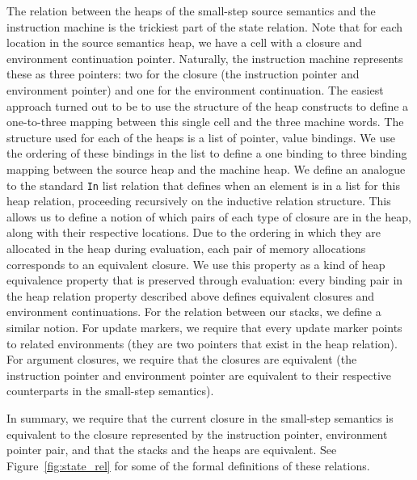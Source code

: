 The relation between the heaps of the small-step source semantics and the
instruction machine is the trickiest part of the state relation. Note that for
each location in the source semantics heap, we have a cell with a closure and
environment continuation pointer. Naturally, the instruction machine represents
these as three pointers: two for the closure (the instruction pointer and
environment pointer) and one for the environment continuation. The easiest
approach turned out to be to use the structure of the heap constructs to define a
one-to-three mapping between this single cell and the three machine words. The
structure used for each of the heaps is a list of pointer, value bindings.
We use the ordering of these bindings in the list to define a one binding to
three binding mapping between the source heap and the machine heap. We define an
analogue to the standard \texttt{In} list relation that defines when an element
is in a list for this heap relation, proceeding recursively on the inductive
relation structure. This allows us to define a notion of which pairs of each
type of closure are in the heap, along with their respective locations. Due to
the ordering in which they are allocated in the heap during evaluation, each pair of
memory allocations corresponds to an equivalent closure. We use this property 
as a kind of heap equivalence property that is preserved through evaluation:
every binding pair in the heap relation property described above defines
equivalent closures and environment continuations. For the relation between our
stacks, we define a similar notion. For update markers, we require that every
update marker points to related environments (they are two pointers that exist
in the heap relation). For argument closures, we require that the closures are
equivalent (the instruction pointer and environment pointer are equivalent to
their respective counterparts in the small-step semantics). 

In summary, we require that the current closure in the small-step semantics is
equivalent to the closure represented by the instruction pointer, environment
pointer pair, and that the stacks and the heaps are equivalent. See
Figure~\ref{fig:state_rel} for some of the formal definitions of these
relations. 

